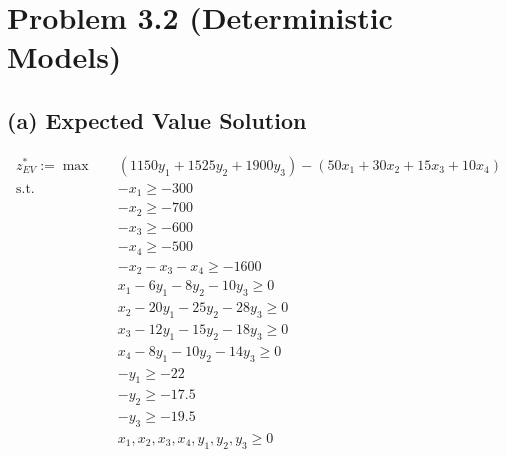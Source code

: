 \documentclass[7pt]{article}
\begin{document}
\newpage

\section{Problem 3.2 (Deterministic Models)}
\subsection*{(a) Expected Value Solution}
\vspace{-2em}
\begin{minipage}[t]{0.58\textwidth}
    \begin{align*}
        z_{EV}^* := \max \quad
         & \left(1150y_1 + 1525y_2 + 1900 y_3 \right)
        - \left(50 x_1 + 30 x_2 + 15 x_3 + 10 x_4 \right) \\
        \text{s.t.} \quad
         & -x_1 \geq -300                                 \\
         & -x_2 \geq -700                                 \\
         & -x_3 \geq -600                                 \\
         & -x_4 \geq -500                                 \\
         & -x_2 - x_3 - x_4 \geq -1600                    \\
         & x_1 - 6 y_1 - 8 y_2 - 10 y_3 \geq 0            \\
         & x_2 - 20 y_1 - 25 y_2 - 28 y_3 \geq 0 \quad    \\
         & x_3 - 12 y_1 - 15 y_2 - 18 y_3 \geq 0 \quad    \\
         & x_4 - 8 y_1 - 10 y_2 - 14 y_3 \geq 0 \quad     \\
         & -y_1 \geq -22 \quad                            \\
         & -y_2 \geq -17.5 \quad                          \\
         & -y_3 \geq -19.5 \quad                          \\
         & x_1, x_2, x_3, x_4, y_1, y_2, y_3 \geq 0
    \end{align*}
\end{minipage}
\hfill
\end{document}
